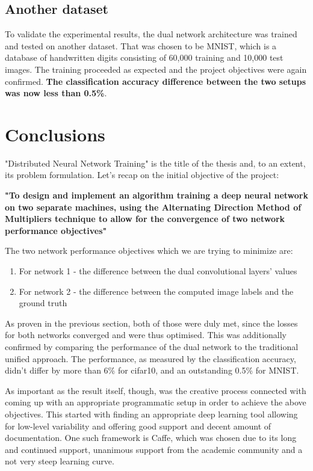 \documentclass[a4paper, 12pt]{article}
\numberwithin{equation}{section}
\begin{document}
	\subsection{Another dataset}

	To validate the experimental results, the dual network architecture was trained and tested on another dataset. That was chosen to be MNIST, which is a database of handwritten digits consisting of 60,000 training and 10,000 test images. The training proceeded as expected and the project objectives were again confirmed. \textbf{The classification accuracy difference between the two setups was now less than 0.5\%}.

	\section{Conclusions}

	"Distributed Neural Network Training" is the title of the thesis and, to an extent, its problem formulation. Let's recap on the initial objective of the project:

	\textbf{"To design and implement an algorithm training a deep neural network on two separate machines, using the Alternating Direction Method of Multipliers technique to allow for the convergence of two network performance objectives"}

	The two network performance objectives which we are trying to minimize are:
	\begin{enumerate}
		\item For network 1 - the difference between the dual convolutional layers' values
		\item For network 2 - the difference between the computed image labels and the ground truth
	\end{enumerate}

	As proven in the previous section, both of those were duly met, since the losses for both networks converged and were thus optimised. This was additionally confirmed by comparing the performance of the dual network to the traditional unified approach. The performance, as measured by the classification accuracy, didn't differ by more than 6\% for cifar10, and an outstanding 0.5\% for MNIST.

	As important as the result itself, though, was the creative process connected with coming up with an appropriate programmatic setup in order to achieve the above objectives. This started with finding an appropriate deep learning tool allowing for low-level variability and offering good support and decent amount of documentation. One such framework is Caffe, which was chosen due to its long and continued support, unanimous support from the academic community and a not very steep learning curve.
\end{document}
